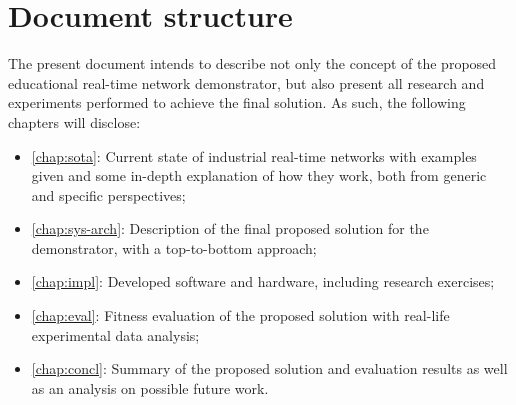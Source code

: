 \section{Document structure} \label{sec:doc-struct}

The present document intends to describe not only the concept of the proposed educational real-time network demonstrator, but also present all research and experiments performed to achieve the final solution. As such, the following chapters will disclose:

\begin{itemize}
	\item \autoref{chap:sota}: Current state of industrial real-time networks with examples given and some in-depth explanation of how they work, both from generic and specific perspectives;

	\item \autoref{chap:sys-arch}: Description of the final proposed solution for the demonstrator, with a top-to-bottom approach;

	\item \autoref{chap:impl}: Developed software and hardware, including research exercises;

	\item \autoref{chap:eval}: Fitness evaluation of the proposed solution with real-life experimental data analysis;

	\item \autoref{chap:concl}: Summary of the proposed solution and evaluation results as well as an analysis on possible future work.
\end{itemize}
